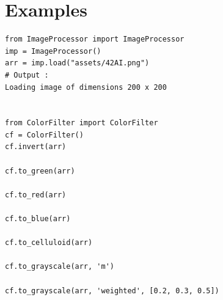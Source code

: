 \documentclass{42-en}
\begin{document}
\section*{Examples}
\begin{verbatim}
from ImageProcessor import ImageProcessor
imp = ImageProcessor()
arr = imp.load("assets/42AI.png")
# Output :
Loading image of dimensions 200 x 200


from ColorFilter import ColorFilter
cf = ColorFilter()
cf.invert(arr)

cf.to_green(arr)

cf.to_red(arr)

cf.to_blue(arr)

cf.to_celluloid(arr)

cf.to_grayscale(arr, 'm')

cf.to_grayscale(arr, 'weighted', [0.2, 0.3, 0.5])
\end{verbatim}
\end{document}
